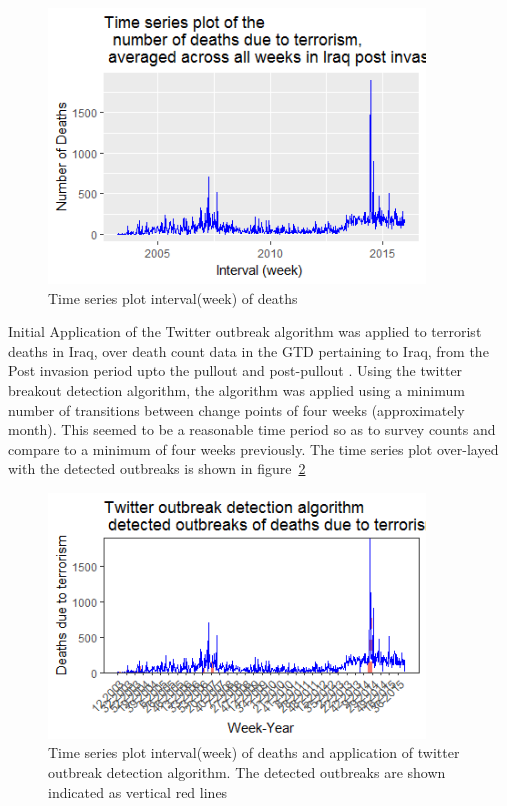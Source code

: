 \begin{figure}[t]
\includegraphics[width=10cm]{Peters_experiment_markdown_files/figure-latex/Rplot03_weekly_death_counts_iraq.png}
\caption{Time series plot interval(week) of deaths}
\label{fig:tseriesweek}
\centering
\end{figure}

Initial Application of the Twitter outbreak algorithm was applied to terrorist deaths in Iraq, over death count data in the GTD pertaining to Iraq, from the Post invasion period upto the pullout and post-pullout . Using the twitter breakout detection algorithm, the algorithm was applied using a minimum number of transitions between change points of four weeks (approximately month). This seemed to be a reasonable time period so as to survey counts and compare to a minimum of four weeks previously. The time series plot over-layed with the detected outbreaks is shown in figure~\ref{fig:tseriesweektwitter outbreak} 

\begin{figure}[t]
\includegraphics[width=10cm]{Peters_experiment_markdown_files/figure-latex/Rplot02_Twitter_outbreak_detection_algo.png}
\caption{Time series plot interval(week) of deaths and application of twitter outbreak detection algorithm. The detected outbreaks are shown indicated as vertical red lines}
\label{fig:tseriesweektwitter outbreak}
\centering
\end{figure}

